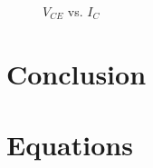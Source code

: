 
\begin{figure}[hbtp]
  \centering
  \resizebox{1.0\textwidth}{!}{}
  \caption{\label{fig:graph} $V_{CE}$ vs. $I_C$}
\end{figure}

\section{Conclusion}
\label{sec:conclusion}

\section{Equations}
\label{sec:equations}

